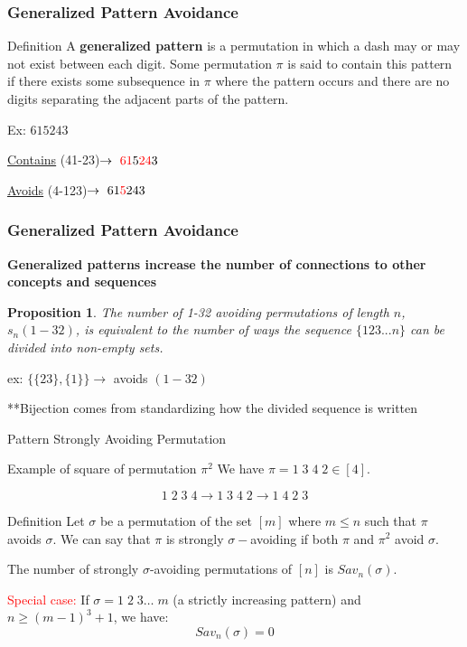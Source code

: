 \documentclass{beamer}  %
\newtheorem{prop}{Proposition}
\begin{document}
\begin{frame}
\frametitle{Generalized Pattern Avoidance} 
\begin{block}{Definition}
A {\bf generalized pattern} is a permutation in which a dash may or may not exist between each digit. Some permutation $\pi$ is said to contain this pattern if there exists some subsequence in $\pi$ where the pattern occurs and there are no digits separating the adjacent parts of the pattern.
\end{block}

Ex: $615243$

\hspace{1cm} \underline{Contains} (41-23)$ \rightarrow\    \textcolor{red}{61}5\textcolor{red}{24}3$

\hspace{1cm} \underline{Avoids} (4-123)$ \rightarrow\ 
 61\textcolor{red}{5}243$

\vspace{2cm}

\end{frame}

\begin{frame}
\frametitle{Generalized Pattern Avoidance}

{\bf Generalized patterns increase the number of connections to other concepts and sequences}
\vskip11pt
\begin{prop}
    The number of 1-32 avoiding permutations of length $n$, $s_n(1-32)$, is equivalent to the number of ways the sequence $\{123...n\}$ can be divided into non-empty sets.
\end{prop}

ex: $\{\{23\},\{1\}\} \rightarrow$ avoids $(1-32)$

\vskip11pt
**Bijection comes from standardizing how the divided sequence is written
\end{frame}

\begin{frame}{Pattern Strongly Avoiding Permutation}

\begin{exampleblock}{Example of square of permutation $\pi^2$}
    We have $\pi = 1\;3\;4\;2 \in [4]$. 
    
     $$1\;2\;3\;4 \rightarrow 1\;3\;4\;2  \rightarrow 1\;4\;2\;3$$
\end{exampleblock}
\begin{block}{Definition}
    Let $\sigma$ be a permutation of the set $[m]$ where $m \leq n$ such that $\pi$ avoids $\sigma$. We can say that $\pi$ is strongly $\sigma-$avoiding if both $\pi$ and $\pi^2$ avoid $\sigma$.

    The number of strongly $\sigma$-avoiding permutations of $[n]$ is $Sav_n(\sigma)$.
\end{block}

\textcolor{red}{Special case:} If $\sigma = 1\;2\;3\ldots\;m$ (a strictly increasing pattern) and $n \geq (m-1)^3 + 1$, we have: 
$$Sav_n(\sigma)=0$$


\end{frame}
\end{document}
